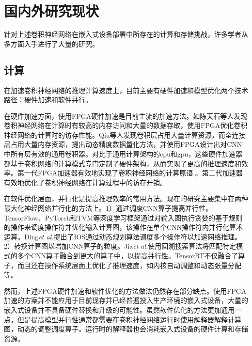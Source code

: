 \section{国内外研究现状}
针对上述卷积神经网络在嵌入式设备部署中所存在的计算和存储挑战，许多学者从多方面入手进行了大量的研究。
\subsection{计算}
在加速卷积神经网络的推理计算速度上，目前主要有硬件加速和模型优化两个技术路径：硬件加速和软件并行。

在硬件加速方面，使用FPGA硬件加速是目前主流的加速方法\cite{clement2011neuflow,farabet2009cnp,qadeer2013convolution,chen2014diannao,chen2014dadiannao,du2015shidiannao,chen2016eyeriss,qiu2016going}。如陈天石\cite{chen2014diannao}等人发现卷积神经网络在计算时有较高的内存访问和大量的数据存取，使用FPGA优化卷积神经网络的计算时的访存性能。Qiu\cite{qiu2016going}等人发现卷积层占用大量计算资源，而全连接层占用大量内存资源，提出动态精度数据量化方法，并使用FPGA设计出对CNN中所有层有效的通用卷积器。对比于通用计算架构的cpu和gpu，这些硬件加速器都基于卷积网络的计算模式专门定制了硬件架构，从而实现了更高的推理速度和效率。第一代FPGA加速器有效地实现了卷积神经网络的计算原语
\cite{clement2011neuflow,qadeer2013convolution,chakradhar2010dynamically}。第二代加速器有效地优化了卷积神经网络在计算过程中的访存开销\cite{chen2014diannao,chen2014dadiannao,du2015shidiannao,chen2016eyeriss,qiu2016going}。

在软件优化层面，并行化\cite{2020IOS,2018Optimizing,0OPTIMIZING}是提高推理效率的常用方法。现在的研究主要集中在两种最大化神经网络并行化的方法上。1）通过调度CNN算子提高并行性。TensorFlow\cite{2016TensorFlow}、PyTorch\cite{elmohamed}和TVM\cite{2018TVM}等深度学习框架通过对输入图执行贪婪的基于规则的操作来调度操作符并优化输入计算图，该操作在单个CNN操作符内并行化算术运算。Ding\textit{et al.}提出了IOS\cite{2020IOS}通过动态规划算法调度多个操作符以加速网络推理。2）转换计算图以增加CNN算子的粒度。Jia\textit{et al.}\cite{0OPTIMIZING}使用回溯搜索算法将匹配特定模式的多个CNN算子融合到更大的算子中，以提高并行性。TensorRT\cite{tensorRT}不仅融合了算子，而且还在操作系统层面上优化了推理速度，如内核自动调整和动态张量分配等。

然而，上述FPGA硬件加速和软件优化的方法做法仍然存在部分缺点。使用FPGA加速的方案并不能应用于目前现存并已经普遍投入生产环境的嵌入式设备，大量的嵌入式设备并不具备硬件替换和升级的可能性。虽然软件优化的方法更加通用一点，但是提高模型并行性通常都需要在卷积神经网络运行时使用解释器解释计算图，动态的调整调度算子。运行时的解释器也会消耗嵌入式设备的硬件计算和存储资源。



